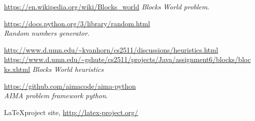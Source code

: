 \documentclass{article}
\begin{document}
\vfill



\begin{thebibliography}{9}
\label{sec_ref}

\url{https://en.wikipedia.org/wiki/Blocks_world}
 \emph {Blocks World problem}.
 
\url{https://docs.python.org/3/library/random.html}
\emph {\\Random numbers generator}.
 
\url{http://www.d.umn.edu/~kvanhorn/cs2511/discussions/heuristics.html}\\
\url{https://www.d.umn.edu/~gshute/cs2511/projects/Java/assignment6/blocks/blocks.xhtml}
\emph{Blocks World heuristics}

\url{https://github.com/aimacode/aima-python}
 \emph {\\AIMA problem framework python}.

\LaTeX project site,
\url{http://latex-project.org/}

\end{thebibliography}
\end{document}
